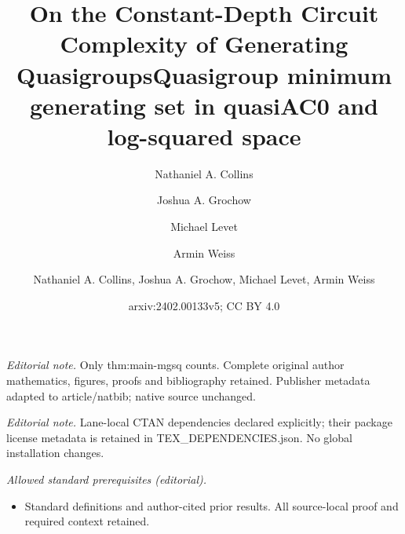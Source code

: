 \documentclass{article}
\title{On the Constant-Depth Circuit Complexity of Generating Quasigroups}
\author{Nathaniel A. Collins \and Joshua A. Grochow \and Michael Levet \and Armin Weiss}\date{}
\title{Quasigroup minimum generating set in quasiAC0 and log-squared space}
\author{Nathaniel A. Collins, Joshua A. Grochow, Michael Levet, Armin Weiss}
\date{arxiv:2402.00133v5; CC BY 4.0}
\begin{document}
\maketitle
\noindent\textit{Editorial note.} Only thm:main-mgsq counts. Complete original author mathematics, figures, proofs and bibliography retained. Publisher metadata adapted to article/natbib; native source unchanged.\par\medskip
\noindent\textit{Editorial note.} Lane-local CTAN dependencies declared explicitly; their package license metadata is retained in TEX\_DEPENDENCIES.json. No global installation changes.\par\medskip
\noindent\textit{Allowed standard prerequisites (editorial).}\begin{itemize}
\item Standard definitions and author-cited prior results. All source-local proof and required context retained.
\end{itemize}\medskip
\maketitle
\end{document}
